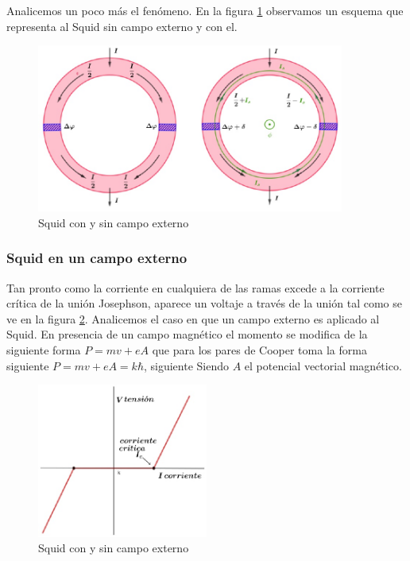 Analicemos un poco más el fenómeno. En la figura \ref{fig:440} observamos un esquema que representa al Squid sin campo externo y con el.

\begin{figure}[H]
    \centering
    \includegraphics[width=0.9\textwidth]{./Figures/fig440}
	\caption{Squid con y sin campo externo}
	\label{fig:440}
\end{figure}

\subsubsection{Squid en un campo externo}

Tan pronto como la corriente en cualquiera de las ramas excede a la corriente crítica de la unión Josephson, aparece un voltaje a través de la unión tal como se ve en la figura \ref{fig:441}. Analicemos el caso en que un campo externo es aplicado al Squid. En presencia de un campo magnético el momento se modifica de la siguiente forma $P=mv+eA$ que para los pares de Cooper toma la forma siguiente $P=mv+eA= k\hbar$, siguiente Siendo $A$ el potencial vectorial magnético. 

\begin{figure}[H]
    \centering
    \includegraphics[width=0.5\textwidth]{./Figures/fig441}
	\caption{Squid con y sin campo externo}
	\label{fig:441}
\end{figure}


